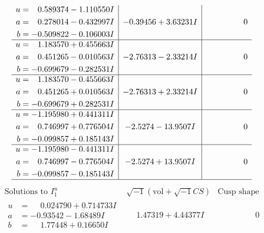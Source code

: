 \documentclass[1p]{elsarticle_modified}
\theoremstyle{definition}
\newcommand{\I}{\sqrt{-1}}
\begin{document}
$$\begin{array}{c|c|c}
\begin{aligned}
u &= \phantom{-}0.589374 - 1.110550 I \\
a &= \phantom{-}0.278014 - 0.432997 I \\
b &= -0.509822 - 0.106003 I\end{aligned}
 & -0.39456 + 3.63231 I & \phantom{-0.000000 } 0 \\ \hline\begin{aligned}
u &= \phantom{-}1.183570 + 0.455663 I \\
a &= \phantom{-}0.451265 - 0.010563 I \\
b &= -0.699679 - 0.282531 I\end{aligned}
 & -2.76313 - 2.33214 I & \phantom{-0.000000 } 0 \\ \hline\begin{aligned}
u &= \phantom{-}1.183570 - 0.455663 I \\
a &= \phantom{-}0.451265 + 0.010563 I \\
b &= -0.699679 + 0.282531 I\end{aligned}
 & -2.76313 + 2.33214 I & \phantom{-0.000000 } 0 \\ \hline\begin{aligned}
u &= -1.195980 + 0.441311 I \\
a &= \phantom{-}0.746997 + 0.776504 I \\
b &= -0.099857 + 0.185143 I\end{aligned}
 & -2.5274 - 13.9507 I & \phantom{-0.000000 } 0 \\ \hline\begin{aligned}
u &= -1.195980 - 0.441311 I \\
a &= \phantom{-}0.746997 - 0.776504 I \\
b &= -0.099857 - 0.185143 I\end{aligned}
 & -2.5274 + 13.9507 I & \phantom{-0.000000 } 0\\
 \hline 
 \end{array}$$\newpage$$\begin{array}{c|c|c}  
\text{Solutions to }I^u_{1}& \I (\text{vol} + \sqrt{-1}CS) & \text{Cusp shape}\\
 \hline 
\begin{aligned}
u &= \phantom{-}0.024790 + 0.714733 I \\
a &= -0.93542 - 1.68489 I \\
b &= \phantom{-}1.77448 + 0.16650 I\end{aligned}
 & \phantom{-}1.47319 + 4.44377 I & \phantom{-0.000000 } 0 \\ \hline\begin{aligned}

\end{aligned}
\end{array}$$
\end{document}
